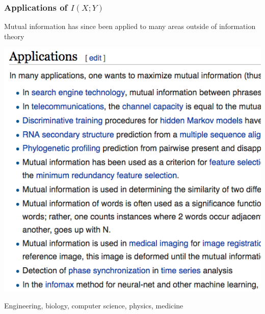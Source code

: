 \documentclass{beamer}
\begin{document}
\begin{frame}
\frametitle{Applications of $I(X; Y)$}
Mutual information has since been applied to many areas outside of information theory\pause
\begin{center}
\includegraphics[scale = 0.3]{wiki_apps.png}
\end{center}
Engineering, biology, computer science, physics, medicine
\end{frame}
\end{document}

